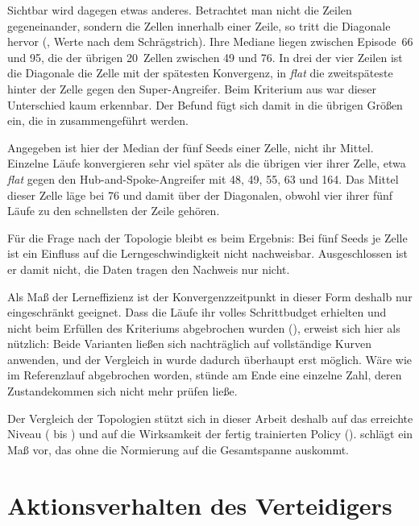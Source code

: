 Sichtbar wird dagegen etwas anderes. Betrachtet man nicht die Zeilen
gegeneinander, sondern die Zellen innerhalb einer Zeile, so tritt die
Diagonale hervor (, Werte nach dem
Schrägstrich). Ihre Mediane liegen zwischen Episode~66 und 95, die der übrigen
20~Zellen zwischen 49 und 76. In drei der vier Zeilen ist die Diagonale die Zelle mit der spätesten
Konvergenz, in \emph{flat} die zweitspäteste hinter der Zelle gegen den
Super-Angreifer. Beim Kriterium aus  war dieser
Unterschied kaum erkennbar. Der Befund fügt sich damit in die übrigen Größen
ein, die in  zusammengeführt werden.

Angegeben ist hier der Median der fünf Seeds einer Zelle, nicht ihr Mittel.
Einzelne Läufe konvergieren sehr viel später als die übrigen vier ihrer Zelle,
etwa \emph{flat} gegen den Hub-and-Spoke-Angreifer mit 48, 49, 55, 63 und 164.
Das Mittel dieser Zelle läge bei 76 und damit über der Diagonalen, obwohl vier
ihrer fünf Läufe zu den schnellsten der Zeile gehören.

Für die Frage nach der Topologie bleibt es beim Ergebnis: Bei fünf Seeds je
Zelle ist ein Einfluss auf die Lerngeschwindigkeit nicht nachweisbar.
Ausgeschlossen ist er damit nicht, die Daten tragen den Nachweis nur nicht.

Als Maß der Lerneffizienz ist der Konvergenzzeitpunkt in dieser Form deshalb
nur eingeschränkt geeignet. Dass die Läufe ihr volles Schrittbudget erhielten
und nicht beim Erfüllen des Kriteriums abgebrochen wurden
(), erweist sich hier als nützlich: Beide Varianten ließen
sich nachträglich auf vollständige Kurven anwenden, und der Vergleich in
 wurde dadurch überhaupt erst möglich. Wäre wie
im Referenzlauf abgebrochen worden, stünde am Ende eine einzelne Zahl, deren
Zustandekommen sich nicht mehr prüfen ließe.

Der Vergleich der Topologien stützt sich in dieser Arbeit deshalb auf das
erreichte Niveau ( bis ) und auf
die Wirksamkeit der fertig trainierten Policy
().  schlägt ein Maß vor,
das ohne die Normierung auf die Gesamtspanne auskommt.

\section{Aktionsverhalten des Verteidigers}
\label{sec:aktionen}

